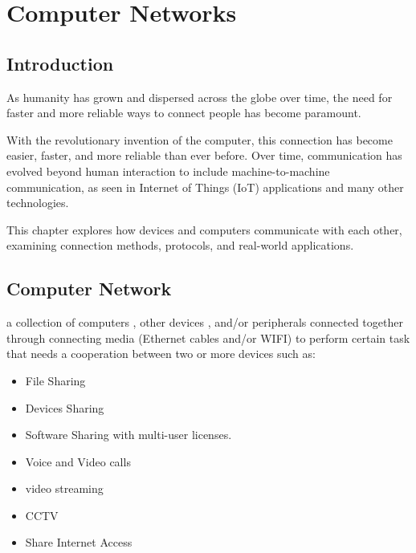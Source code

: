 \chapter{Computer Networks}

\section{Introduction}

As humanity has grown and dispersed across the globe over time, the need for faster and more reliable ways to connect people has become paramount.

With the revolutionary invention of the computer, this connection has become easier, faster, and more reliable than ever before. Over time, communication has evolved beyond human interaction to include machine-to-machine communication, as seen in Internet of Things (IoT) applications and many other technologies.

This chapter explores how devices and computers communicate with each other, examining connection methods, protocols, and real-world applications.

\section{Computer Network}
a collection of computers , other devices , and/or
peripherals connected together through connecting
media (Ethernet cables and/or WIFI) to perform certain task that needs a cooperation between two or more devices such as:
\begin{itemize}
	\item File Sharing
	\item Devices Sharing
	\item Software Sharing with multi-user licenses.
	\item Voice and Video calls
	\item video streaming
	\item CCTV 
	\item Share Internet Access
\end{itemize}

